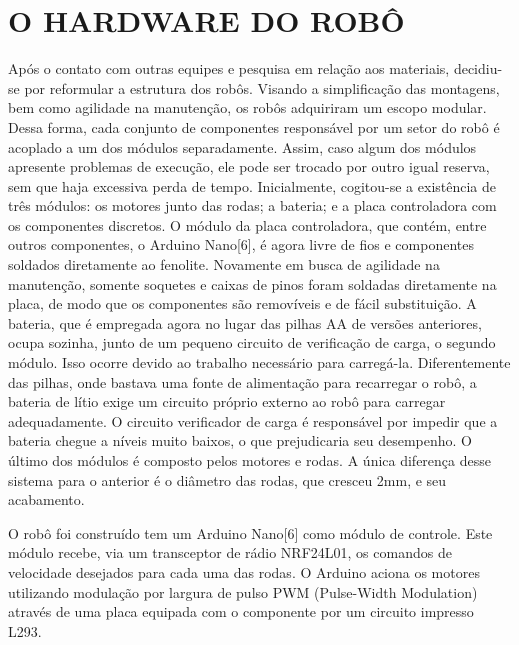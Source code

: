 
\section{O HARDWARE DO ROB{\^O}}

Ap{\'o}s o contato com outras equipes e pesquisa em rela{\c c}{\~a}o aos materiais, decidiu-se por reformular a estrutura 
dos rob{\^o}s. Visando a simplifica{\c c}{\~a}o das montagens, bem como agilidade na manuten{\c c}{\~a}o, os rob{\^o}s 
adquiriram um escopo modular. Dessa forma, cada conjunto de componentes respons{\'a}vel por um setor do rob{\^o} {\'e} 
acoplado a um dos m{\'o}dulos separadamente. Assim, caso algum dos m{\'o}dulos apresente problemas de execu{\c c}{\~a}o, 
ele pode ser trocado por outro igual reserva, sem que haja excessiva perda de tempo. Inicialmente, cogitou-se a 
exist{\^e}ncia de tr{\^e}s m{\'o}dulos: os motores junto das rodas; a bateria; e a placa controladora com os componentes
discretos. O m{\'o}dulo da placa controladora, que cont{\'e}m, entre outros componentes, o Arduino Nano[6], {\'e} agora 
livre de fios e componentes soldados diretamente ao fenolite. Novamente em busca de agilidade na manuten{\c c}{\~a}o, 
somente soquetes e caixas de pinos foram soldadas diretamente na placa, de modo que os componentes s{\~a}o remov{\'i}veis
e de f{\'a}cil substitui{\c c}{\~a}o. A bateria, que {\'e} empregada agora no lugar das pilhas AA de vers{\~o}es 
anteriores, ocupa sozinha, junto de um pequeno circuito de verifica{\c c}{\~a}o de carga, o segundo m{\'o}dulo. Isso 
ocorre devido ao trabalho necess{\'a}rio para carreg{\'a}-la. Diferentemente das pilhas, onde bastava uma fonte de 
alimenta{\c c}{\~a}o para recarregar o rob{\^o}, a bateria de l{\'i}tio exige um circuito pr{\'o}prio externo ao rob{\^o} 
para carregar adequadamente. O circuito verificador de carga {\'e} respons{\'a}vel por impedir que a bateria chegue a 
n{\'i}veis muito baixos, o que prejudicaria seu desempenho. O {\'u}ltimo dos m{\'o}dulos {\'e} composto pelos motores e 
rodas. A {\'u}nica diferen{\c c}a desse sistema para o anterior {\'e} o di{\^a}metro das rodas, que cresceu 2mm, e seu 
acabamento.

O rob{\^o} foi constru{\'i}do tem um Arduino Nano[6] como m{\'o}dulo de controle. Este m{\'o}dulo recebe, via um 
transceptor de r{\'a}dio NRF24L01, os comandos de velocidade desejados para cada uma das rodas. O Arduino aciona os 
motores utilizando modula{\c c}{\~a}o por largura de pulso PWM (Pulse-Width Modulation) atrav{\'e}s 
de uma placa equipada com o componente por um circuito impresso L293.

